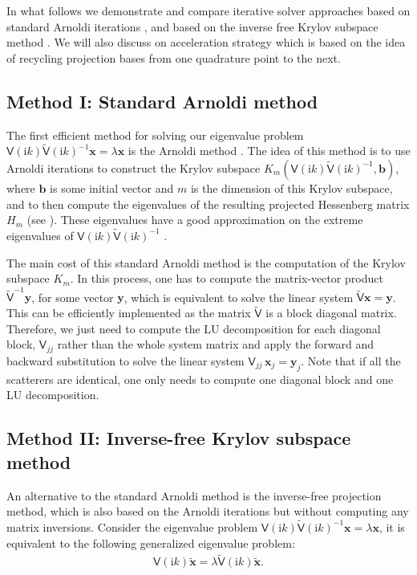 In what follows we demonstrate and compare iterative solver approaches based on standard Arnoldi iterations \cite{arnoldi1951principle}\cite{MR3396212}, and based on the 
inverse free Krylov subspace method \cite{golub2002inverse} \cite{money2005algorithm}.
We will also discuss on acceleration strategy which is based on the idea of recycling projection bases from one quadrature point to the next. 
\subsection{Method I: Standard Arnoldi method}
The first efficient method for solving our eigenvalue problem $\mathsf{V}(\mathrm{i}k)\tilde{\mathsf{V}}(\mathrm{i}k)^{-1}\boldsymbol{x} = \lambda\boldsymbol{x}$ 
is the Arnoldi method \cite[Section 6.2]{MR3396212}. The idea of this method is to use Arnoldi iterations to construct the Krylov subspace  
$K_{m}(\mathsf{V}(\mathrm{i}k)\tilde{\mathsf{V}}(\mathrm{i}k)^{-1}, \boldsymbol{b})$, where $\boldsymbol{b}$ is some 
initial vector and $m$ is the dimension of this Krylov subspace, and to then compute the eigenvalues of the resulting projected Hessenberg matrix $H_m$ (see \cite{saad2011numerical}).
These eigenvalues have a good approximation on the extreme eigenvalues of $\mathsf{V}(\mathrm{i}k)\tilde{\mathsf{V}}(\mathrm{i}k)^{-1}$ \cite[Proposition 6.10, Theorem 6.8]{MR3396212}. 

The main cost of this standard Arnoldi method is the computation of the Krylov subspace $K_{m}$. In this process, one has to compute the matrix-vector product 
$\tilde{\mathsf{V}}^{-1}\boldsymbol{y}$, for some vector $\boldsymbol{y}$, which is equivalent to solve the linear system $\tilde{\mathsf{V}}\boldsymbol{x} = \boldsymbol{y}$. This can be 
efficiently implemented as the matrix $\tilde{\mathsf{V}}$ is a block diagonal matrix. Therefore, we just need to compute the LU decomposition for each diagonal 
block, $\mathsf{V}_{jj}$ rather than the whole system matrix and apply the forward and backward substitution to solve the linear system 
$\mathsf{V}_{jj}\,\boldsymbol{x}_j = \boldsymbol{y}_j$. Note that if all the scatterers are identical, one only needs to compute one diagonal block and one LU decomposition. 

\subsection{Method II: Inverse-free Krylov subspace method}
An alternative to the standard Arnoldi method is the inverse-free projection method, which is also based on the Arnoldi iterations but without computing any 
matrix inversions. Consider the eigenvalue problem $\mathsf{V}(\mathrm{i}k)\tilde{\mathsf{V}}(\mathrm{i}k)^{-1}\boldsymbol{x} = \lambda\boldsymbol{x}$,
it is equivalent to the following generalized eigenvalue problem:
\begin{align}\label{GEP}
    \mathsf{V}(\mathrm{i}k)\tilde{\boldsymbol{x}} = \lambda \tilde{\mathsf{V}}(\mathrm{i}k)\tilde{\boldsymbol{x}}.
\end{align}


